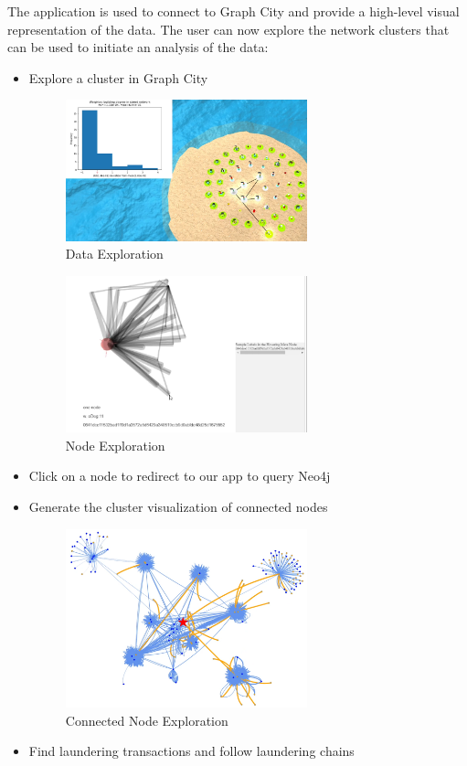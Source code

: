 \textnormal{
The application is used to connect to Graph City and provide a high-level visual representation of the data. The user can now explore the network clusters that can be used to initiate an analysis of the data:}
\begin{itemize}
    \item Explore a cluster in Graph City
    
    \begin{figure}[htp]
    \centering
    \includegraphics[width=7cm]{imgs/exploration.png}
    \caption{Data Exploration}
    \label{fig:FlowDiagram}
    \end{figure}
    
    \begin{figure}[htp]
    \centering
    \includegraphics[width=7cm]{imgs/nodeexlore.png}
    \caption{Node Exploration}
    \label{fig:DataFDiagram}
    \end{figure}
    \item Click on a node to redirect to our app to query Neo4j
    \item Generate the cluster visualization of connected nodes
    
    \begin{figure}[htp]
    \centering
    \includegraphics[width=7cm]{imgs/laundering.png}
    \caption{Connected Node Exploration}
    \label{fig:Data}
    \end{figure}
    \item Find laundering transactions and follow laundering chains
    
\end{itemize}